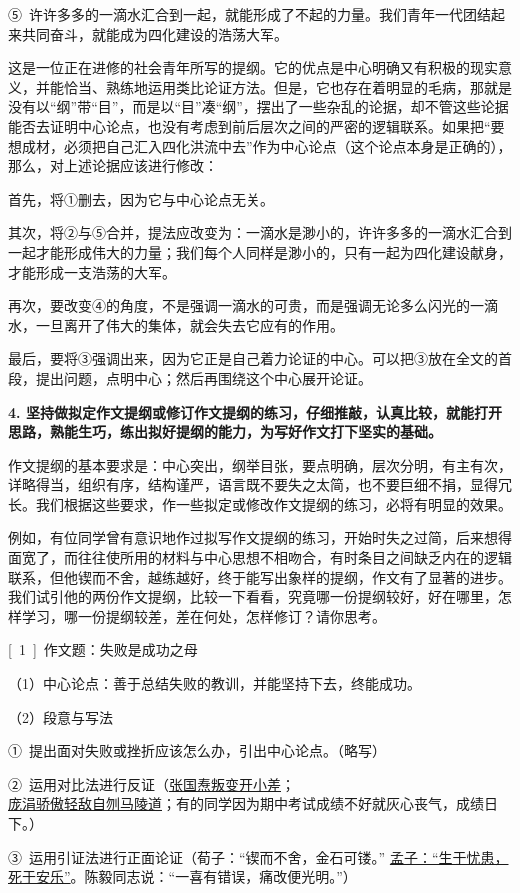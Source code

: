 ⑤\ 许许多多的一滴水汇合到一起，就能形成了不起的力量。我们青年一代团结起来共同奋斗，就能成为四化建设的浩荡大军。

这是一位正在进修的社会青年所写的提纲。它的优点是中心明确又有积极的现实意义，并能恰当、熟练地运用类比论证方法。但是，它也存在着明显的毛病，那就是没有以“纲”带“目”，而是以“目”凑“纲”，摆出了一些杂乱的论据，却不管这些论据能否去证明中心论点，也没有考虑到前后层次之间的严密的逻辑联系。如果把“要想成材，必须把自己汇入四化洪流中去”作为中心论点（这个论点本身是正确的），那么，对上述论据应该进行修改：

首先，将①删去，因为它与中心论点无关。

其次，将②与⑤合并，提法应改变为：一滴水是渺小的，许许多多的一滴水汇合到一起才能形成伟大的力量；我们每个人同样是渺小的，只有一起为四化建设献身，才能形成一支浩荡的大军。

再次，要改变④的角度，不是强调一滴水的可贵，而是强调无论多么闪光的一滴水，一旦离开了伟大的集体，就会失去它应有的作用。

最后，要将③强调出来，因为它正是自己着力论证的中心。可以把③放在全文的首段，提出问题，点明中心；然后再围绕这个中心展开论证。

\textbf{4. 坚持做拟定作文提纲或修订作文提纲的练习，仔细推敲，认真比较，就能打开思路，熟能生巧，练出拟好提纲的能力，为写好作文打下坚实的基础。}

作文提纲的基本要求是：中心突出，纲举目张，要点明确，层次分明，有主有次，详略得当，组织有序，结构谨严，语言既不要失之太简，也不要巨细不捐，显得冗长。我们根据这些要求，作一些拟定或修改作文提纲的练习，必将有明显的效果。

例如，有位同学曾有意识地作过拟写作文提纲的练习，开始时失之过简，后来想得面宽了，而往往使所用的材料与中心思想不相吻合，有时条目之间缺乏内在的逻辑联系，但他锲而不舍，越练越好，终于能写出象样的提纲，作文有了显著的进步。我们试引他的两份作文提纲，比较一下看看，究竟哪一份提纲较好，好在哪里，怎样学习，哪一份提纲较差，差在何处，怎样修订？请你思考。

[\ 1\ ]\ 作文题：失败是成功之母

（1）中心论点：善于总结失败的教训，并能坚持下去，终能成功。

（2）段意与写法

①\ 提出面对失败或挫折应该怎么办，引出中心论点。（略写）

②\ 运用对比法进行反证（\uline{张国焘叛变开小差}；\\ 
\uline{庞涓骄傲轻敌自刎马陵道}；有的同学因为期中考试成绩不好就灰心丧气，成绩日下。）

③\ 运用引证法进行正面论证（荀子：“锲而不舍，金石可镂。”
\uline{孟子：“生于忧患，死于安乐”}。陈毅同志说：“一喜有错误，痛改便光明。”）

